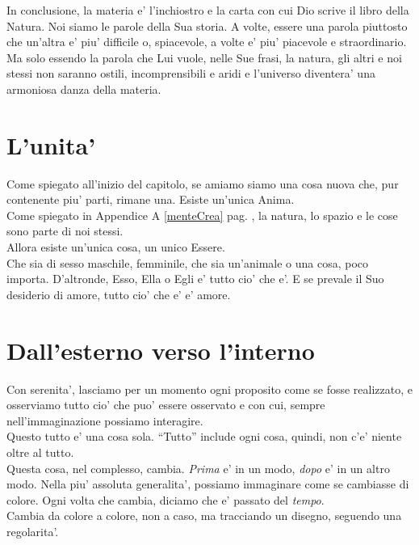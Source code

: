 In conclusione, la materia e' l'inchiostro e la carta con cui Dio scrive il libro della Natura. Noi siamo le parole della Sua storia. A volte, essere una parola piuttosto che un'altra e' piu' difficile o, spiacevole, a volte e' piu' piacevole e straordinario. Ma solo essendo la parola che Lui vuole, nelle Sue frasi, la natura, gli altri e noi stessi non saranno ostili, incomprensibili e aridi e l'universo diventera' una armoniosa danza della materia.


\section{L'unita'}
Come spiegato all'inizio del capitolo, se amiamo siamo una cosa nuova che, pur contenente piu' parti, rimane una. Esiste un'unica Anima.\\
Come spiegato in Appendice A \ref{menteCrea} pag. \pageref{menteCrea}, la natura, lo spazio e le cose sono parte di noi stessi.\\
Allora esiste un'unica cosa, un unico Essere.\\

Che sia di sesso maschile, femminile, che sia un'animale o una cosa, poco importa. D'altronde, Esso, Ella o Egli e' tutto cio' che e'. E se prevale il Suo desiderio di amore, tutto cio' che e' e' amore.

\section{Dall'esterno verso l'interno}
\label{extInt}

Con serenita', lasciamo per un momento ogni proposito come se fosse realizzato, e osserviamo tutto cio' che puo' essere osservato e con cui, sempre nell'immaginazione possiamo interagire.\\
Questo tutto e' una cosa sola. ``Tutto'' include ogni cosa, quindi, non c'e' niente oltre al tutto.\\
Questa cosa, nel complesso, cambia. \emph{Prima} e' in un modo, \emph{dopo} e' in un altro modo. Nella piu' assoluta generalita', possiamo immaginare come se cambiasse di colore. Ogni volta che cambia, diciamo che e' passato del \emph{tempo}.\\
Cambia da colore a colore, non a caso, ma tracciando un disegno, seguendo una regolarita'. \\

